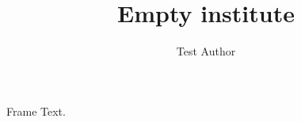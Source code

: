 \documentclass[aspectratio=169,10pt]{beamer}
\institute{}
\title{Empty institute}
\author{Test Author}
\begin{document}
\maketitle
\begin{frame}{Frame}
	Text.
\end{frame}
\end{document}
